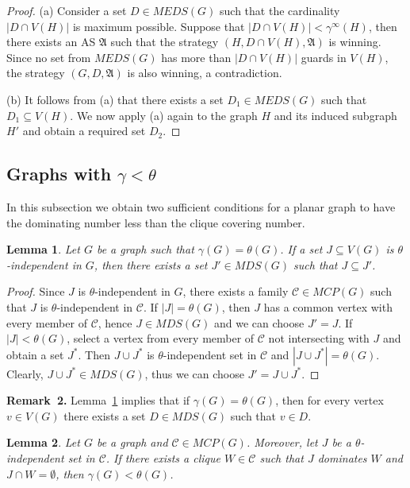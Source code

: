 \documentclass[12pt]{article}
\newtheorem{lemma}{Lemma}
\begin{document}
\begin{proof}
(a) Consider a set $D \in MEDS(G)$ such that the cardinality $|D \cap V(H)|$ is maximum possible. Suppose that $|D \cap V(H)| < \gamma^{\infty}(H)$, then there exists an AS $\mathfrak{A}$ such that the strategy $(H,D \cap V(H),\mathfrak{A})$ is winning. Since no set from $MEDS(G)$ has more than $|D \cap V(H)|$ guards in $V(H)$, the strategy $(G,D,\mathfrak{A})$ is also winning, a contradiction.

(b) It follows from (a) that there exists a set $D_1 \in MEDS(G)$ such that $D_1 \subseteq V(H)$. We now apply (a) again to the graph $H$ and its induced subgraph $H'$ and obtain a required set $D_2$.
\end{proof}

\subsection{Graphs with $\gamma < \theta$}

In this subsection we obtain two sufficient conditions for a planar graph to have the dominating number less than the clique covering number. 

\begin{lemma}\label{l8}
Let $G$ be a graph such that $\gamma(G) = \theta(G)$. If a set $J \subseteq V(G)$ is $\theta$-independent in $G$, then there exists a set $J' \in MDS(G)$ such that $J \subseteq J'$.
\end{lemma}

\begin{proof}
Since $J$ is $\theta$-independent in $G$, there exists a family $\mathcal{C} \in MCP(G)$ such that $J$ is $\theta$-independent in $\mathcal{C}$. If $|J| = \theta(G)$, then $J$ has a common vertex with every member of $\mathcal{C}$, hence $J \in MDS(G)$ and we can choose $J' = J$. If $|J| < \theta(G)$, select a vertex from every member of $\mathcal{C}$ not intersecting with $J$ and obtain a set $J^*$. Then $J \cup J^*$ is $\theta$-independent set in $\mathcal{C}$ and $|J \cup J^*| = \theta(G)$. Clearly, $J \cup J^* \in MDS(G)$, thus we can choose $J' = J \cup J^*$. 
\end{proof}

\textbf{Remark~2.} Lemma~\ref{l8} implies that if $\gamma(G) = \theta(G)$, then for every vertex $v \in V(G)$ there exists a set $D \in MDS(G)$ such that $v \in D$.


\begin{lemma}\label{l9}
Let $G$ be a graph and $\mathcal{C} \in MCP(G)$. Moreover, let $J$ be a $\theta$-independent set in $\mathcal{C}$. If there exists a clique $W \in \mathcal{C}$ such that $J$ dominates $W$ and $J \cap W = \emptyset$, then $\gamma(G) < \theta(G)$.
\end{lemma}
\end{document}
